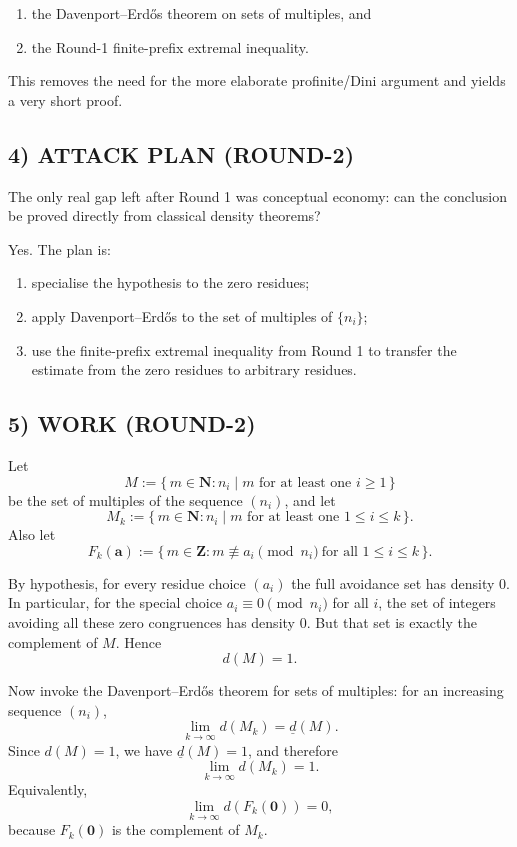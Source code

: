 \begin{enumerate}
\item the Davenport--Erd\H{o}s theorem on sets of multiples, and
\item the Round-1 finite-prefix extremal inequality.
\end{enumerate}

This removes the need for the more elaborate profinite/Dini argument and yields a very short proof.

\subsection*{4) ATTACK PLAN (ROUND-2)}

The only real gap left after Round 1 was conceptual economy: can the conclusion be proved directly from classical density theorems?

Yes. The plan is:

\begin{enumerate}
\item specialise the hypothesis to the zero residues;
\item apply Davenport--Erd\H{o}s to the set of multiples of $\{n_i\}$;
\item use the finite-prefix extremal inequality from Round 1 to transfer the estimate from the zero residues to arbitrary residues.
\end{enumerate}

\subsection*{5) WORK (ROUND-2)}

Let
\[
M:=\{\,m\in\mathbf N : n_i\mid m \text{ for at least one } i\ge 1\,\}
\]
be the set of multiples of the sequence $(n_i)$, and let
\[
M_k:=\{\,m\in\mathbf N : n_i\mid m \text{ for at least one } 1\le i\le k\,\}.
\]
Also let
\[
F_k(\mathbf a):=\{\,m\in\mathbf Z : m\not\equiv a_i\pmod{n_i}\ \text{for all } 1\le i\le k\,\}.
\]

By hypothesis, for every residue choice $(a_i)$ the full avoidance set has density $0$. In particular, for the special choice $a_i\equiv 0\pmod{n_i}$ for all $i$, the set of integers avoiding all these zero congruences has density $0$. But that set is exactly the complement of $M$. Hence
\[
d(M)=1.
\]

Now invoke the Davenport--Erd\H{o}s theorem for sets of multiples: for an increasing sequence $(n_i)$,
\[
\lim_{k\to\infty} d(M_k)=\underline d(M).
\]
Since $d(M)=1$, we have $\underline d(M)=1$, and therefore
\[
\lim_{k\to\infty} d(M_k)=1.
\]
Equivalently,
\[
\lim_{k\to\infty} d(F_k(\mathbf 0))=0,
\]
because $F_k(\mathbf 0)$ is the complement of $M_k$.

